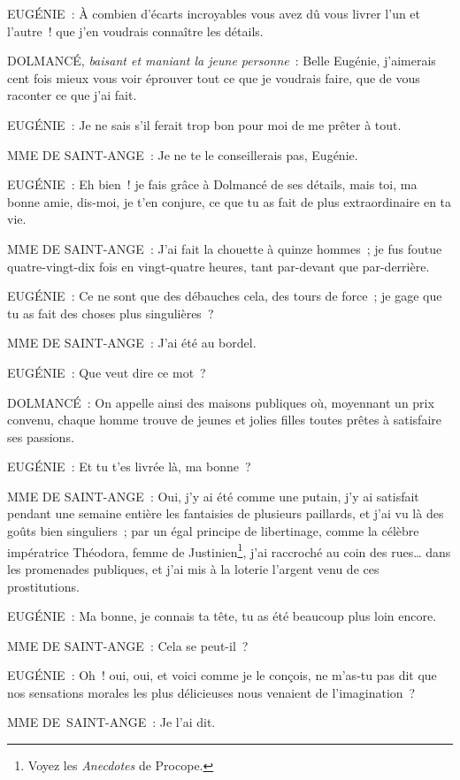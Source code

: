 \documentclass[french,twoside]{book} %
\begin{document}
EUGÉNIE : À combien d’écarts incroyables vous avez dû vous livrer l’un et l’autre ! que j’en voudrais connaître les détails.\par
DOLMANCÉ, {\itshape baisant et maniant la jeune personne} : Belle Eugénie, j’aimerais cent fois mieux vous voir éprouver tout ce que je voudrais faire, que de vous raconter ce que j’ai fait.\par
EUGÉNIE : Je ne sais s’il ferait trop bon pour moi de me prêter à tout.\par
MME DE SAINT-ANGE : Je ne te le conseillerais pas, Eugénie.\par
EUGÉNIE : Eh bien ! je fais grâce à Dolmancé de ses détails, mais toi, ma bonne amie, dis-moi, je t’en conjure, ce que tu as fait de plus extraordinaire en ta vie.\par
MME DE SAINT-ANGE : J’ai fait la chouette à quinze hommes ; je fus foutue quatre-vingt-dix fois en vingt-quatre heures, tant par-devant que par-derrière.\par
EUGÉNIE : Ce ne sont que des débauches cela, des tours de force ; je gage que tu as fait des choses plus singulières ?\par
MME DE SAINT-ANGE : J’ai été au bordel.\par
EUGÉNIE : Que veut dire ce mot ?\par
DOLMANCÉ : On appelle ainsi des maisons publiques où, moyennant un prix convenu, chaque homme trouve de jeunes et jolies filles toutes prêtes à satisfaire ses passions.\par
EUGÉNIE : Et tu t’es livrée là, ma bonne ?\par
MME DE SAINT-ANGE : Oui, j’y ai été comme une putain, j’y ai satisfait pendant une semaine entière les fantaisies de plusieurs paillards, et j’ai vu là des goûts bien singuliers ; par un égal principe de libertinage, comme la célèbre impératrice Théodora, femme de Justinien\footnote{ Voyez les {\itshape Anecdotes} de Procope.}, j’ai raccroché au coin des rues… dans les promenades publiques, et j’ai mis à la loterie l’argent venu de ces prostitutions.\par
EUGÉNIE : Ma bonne, je connais ta tête, tu as été beaucoup plus loin encore.\par
MME DE SAINT-ANGE : Cela se peut-il ?\par
EUGÉNIE : Oh ! oui, oui, et voici comme je le conçois, ne m’as-tu pas dit que nos sensations morales les plus délicieuses nous venaient de l’imagination ?\par
MME DE SAINT-ANGE : Je l’ai dit.\par
\end{document}
